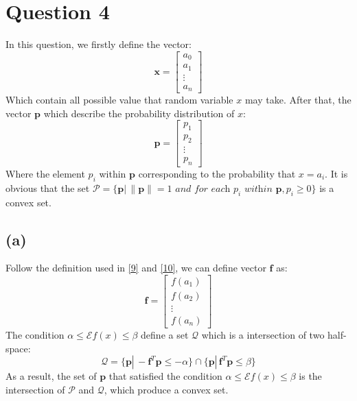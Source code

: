 \documentclass[10pt,a4paper]{article}
\begin{document}
\section*{Question 4}
In this question, we firstly define the vector:
\begin{equation}
	\mathbf{x} = \begin{bmatrix}
	a_{0} \\
	a_{1} \\
	\vdots \\
	a_{n}
	\end{bmatrix}
	\label{9}
\end{equation}
Which contain all possible value that random variable $x$ may take. After that, the vector $\mathbf{p}$ which describe the probability distribution of $x$:
\begin{equation}
	\mathbf{p} = \begin{bmatrix}
	p_{1} \\
	p_{2} \\
	\vdots \\
	p_{n}
	\end{bmatrix}
	\label{10}
\end{equation}
Where the element $p_{i}$ within $\mathbf{p}$ corresponding to the probability that $x = a_{i}$. It is obvious that the set $\mathcal{P} = \{ \mathbf{p} |\, \| \mathbf{p} \| = 1 \textit{ and for each } p_{i} \textit{ within } \mathbf{p}, p_{i} \geq 0 \}$ is a convex set.

\subsection*{(a)}
Follow the definition used in \ref{9} and \ref{10}, we can define vector $\mathbf{f}$ as:
\begin{equation*}
	\mathbf{f} = \begin{bmatrix}
	f(a_{1}) \\
	f(a_{2}) \\
	\vdots \\
	f(a_{n})
	\end{bmatrix}
\end{equation*}
The condition $\alpha \leq \mathcal{E}f(x) \leq \beta$ define a set $\mathcal{Q}$ which is a intersection of two half-space:
\begin{equation*}
	\mathcal{Q} = \{ \mathbf{p} |\, -\mathbf{f}^{T} \mathbf{p} \leq -\alpha \} \cap \{ \mathbf{p} |\, \mathbf{f}^{T} \mathbf{p} \leq \beta \}
\end{equation*}
As a result, the set of $\mathbf{p}$ that satisfied the condition $\alpha \leq \mathcal{E}f(x) \leq \beta$ is the intersection of $\mathcal{P}$ and $\mathcal{Q}$, which produce a convex set.
\end{document}
